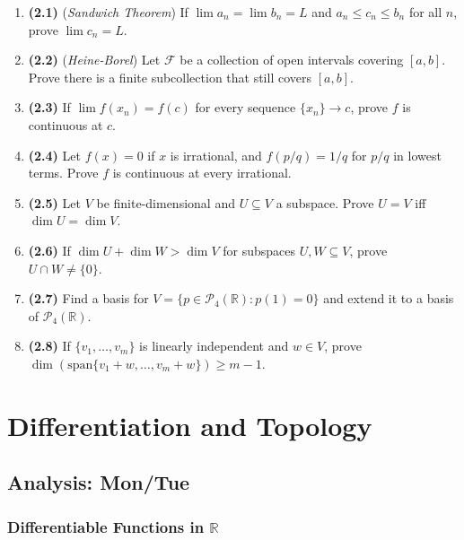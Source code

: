 \documentclass[11pt, letterpaper, openany]{book}
\newcounter{exercise}[chapter]
\begin{document}
\begin{exercises}
\begin{enumerate}
    \item \textbf{(2.1)} (\textit{Sandwich Theorem}) If $\lim a_n = \lim b_n = L$ and $a_n \leq c_n \leq b_n$ for all $n$, prove $\lim c_n = L$.
    
    \item \textbf{(2.2)} (\textit{Heine-Borel}) Let $\mathcal{F}$ be a collection of open intervals covering $[a,b]$. Prove there is a finite subcollection that still covers $[a,b]$.
    
    \item \textbf{(2.3)} If $\lim f(x_n) = f(c)$ for every sequence $\{x_n\} \to c$, prove $f$ is continuous at $c$.
    
    \item \textbf{(2.4)} Let $f(x) = 0$ if $x$ is irrational, and $f(p/q) = 1/q$ for $p/q$ in lowest terms. Prove $f$ is continuous at every irrational.
    
    \item \textbf{(2.5)} Let $V$ be finite-dimensional and $U \subseteq V$ a subspace. Prove $U = V$ iff $\dim U = \dim V$.
    
    \item \textbf{(2.6)} If $\dim U + \dim W > \dim V$ for subspaces $U, W \subseteq V$, prove $U \cap W \neq \{0\}$.
    
    \item \textbf{(2.7)} Find a basis for $V = \{p \in \mathcal{P}_4(\mathbb{R}) : p(1) = 0\}$ and extend it to a basis of $\mathcal{P}_4(\mathbb{R})$.
    
    \item \textbf{(2.8)} If $\{v_1, \ldots, v_m\}$ is linearly independent and $w \in V$, prove $\dim(\text{span}\{v_1+w, \ldots, v_m+w\}) \geq m-1$.
\end{enumerate}
\end{exercises}


\chapter{Differentiation and Topology}

\section{Analysis: Mon/Tue}

\subsection{Differentiable Functions in $\mathbb{R}$}
\end{document}
